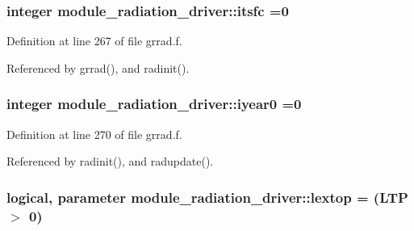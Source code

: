 \subsubsection[{\texorpdfstring{itsfc}{itsfc}}]{\setlength{\rightskip}{0pt plus 5cm}integer module\+\_\+radiation\+\_\+driver\+::itsfc =0\hspace{0.3cm}{\ttfamily [private]}}\hypertarget{group__module__radiation__driver_ga9ee6a89464bf206cc07ea30d7eeaaeb8}{}\label{group__module__radiation__driver_ga9ee6a89464bf206cc07ea30d7eeaaeb8}


Definition at line 267 of file grrad.\+f.



Referenced by grrad(), and radinit().

\subsubsection[{\texorpdfstring{iyear0}{iyear0}}]{\setlength{\rightskip}{0pt plus 5cm}integer module\+\_\+radiation\+\_\+driver\+::iyear0 =0\hspace{0.3cm}{\ttfamily [private]}}\hypertarget{group__module__radiation__driver_ga4d755de48d0aa83f337a2a907ac7d8a2}{}\label{group__module__radiation__driver_ga4d755de48d0aa83f337a2a907ac7d8a2}


Definition at line 270 of file grrad.\+f.



Referenced by radinit(), and radupdate().

\subsubsection[{\texorpdfstring{lextop}{lextop}}]{\setlength{\rightskip}{0pt plus 5cm}logical, parameter module\+\_\+radiation\+\_\+driver\+::lextop = (L\+TP $>$ 0)\hspace{0.3cm}{\ttfamily [private]}}\hypertarget{group__module__radiation__driver_gad27b36d0186c8147fe839eb5c268d157}{}\label{group__module__radiation__driver_gad27b36d0186c8147fe839eb5c268d157}


